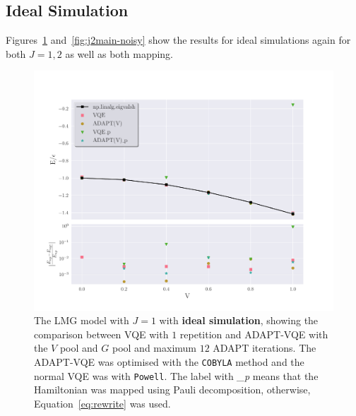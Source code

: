 \subsection{Ideal Simulation}
Figures~\ref{fig:j1main-noisy} and~\ref{fig:j2main-noisy} show the results for ideal simulations again for both $ J=1,2 $ as well as both mapping.
\begin{figure}[ht]
    \centering
\includegraphics[width=\linewidth]{image/lipkin_result/j1main_True.pdf}
    \caption{The LMG model with $ J=1 $ with \textbf{ideal simulation}, showing the comparison between VQE with $ 1 $ repetition and ADAPT-VQE with the $ V $  pool and $ G $ pool and maximum $ 12 $ ADAPT iterations. The ADAPT-VQE was optimised with the \texttt{COBYLA} method and the normal VQE was with \texttt{Powell}. The label with \textit{\_p} means that the Hamiltonian was mapped using Pauli decomposition, otherwise, Equation~\eqref{eq:rewrite} was used.}
    \label{fig:j1main-noisy}
\end{figure}


